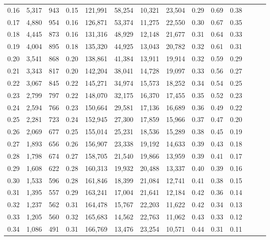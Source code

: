 \begin{tabular}{rrrrrrrrrrrrrr}
0.16 &   5,317 &  943 &  0.15 &  121,991 &   58,254 &  10,321 &  23,504 &  0.29 &  0.69 &      0.38 \\
0.17 &   4,880 &  954 &  0.16 &  126,871 &   53,374 &  11,275 &  22,550 &  0.30 &  0.67 &      0.35 \\
0.18 &   4,445 &  873 &  0.16 &  131,316 &   48,929 &  12,148 &  21,677 &  0.31 &  0.64 &      0.33 \\
0.19 &   4,004 &  895 &  0.18 &  135,320 &   44,925 &  13,043 &  20,782 &  0.32 &  0.61 &      0.31 \\
0.20 &   3,541 &  868 &  0.20 &  138,861 &   41,384 &  13,911 &  19,914 &  0.32 &  0.59 &      0.29 \\
0.21 &   3,343 &  817 &  0.20 &  142,204 &   38,041 &  14,728 &  19,097 &  0.33 &  0.56 &      0.27 \\
0.22 &   3,067 &  845 &  0.22 &  145,271 &   34,974 &  15,573 &  18,252 &  0.34 &  0.54 &      0.25 \\
0.23 &   2,799 &  797 &  0.22 &  148,070 &   32,175 &  16,370 &  17,455 &  0.35 &  0.52 &      0.23 \\
0.24 &   2,594 &  766 &  0.23 &  150,664 &   29,581 &  17,136 &  16,689 &  0.36 &  0.49 &      0.22 \\
0.25 &   2,281 &  723 &  0.24 &  152,945 &   27,300 &  17,859 &  15,966 &  0.37 &  0.47 &      0.20 \\
0.26 &   2,069 &  677 &  0.25 &  155,014 &   25,231 &  18,536 &  15,289 &  0.38 &  0.45 &      0.19 \\
0.27 &   1,893 &  656 &  0.26 &  156,907 &   23,338 &  19,192 &  14,633 &  0.39 &  0.43 &      0.18 \\
0.28 &   1,798 &  674 &  0.27 &  158,705 &   21,540 &  19,866 &  13,959 &  0.39 &  0.41 &      0.17 \\
0.29 &   1,608 &  622 &  0.28 &  160,313 &   19,932 &  20,488 &  13,337 &  0.40 &  0.39 &      0.16 \\
0.30 &   1,533 &  596 &  0.28 &  161,846 &   18,399 &  21,084 &  12,741 &  0.41 &  0.38 &      0.15 \\
0.31 &   1,395 &  557 &  0.29 &  163,241 &   17,004 &  21,641 &  12,184 &  0.42 &  0.36 &      0.14 \\
0.32 &   1,237 &  562 &  0.31 &  164,478 &   15,767 &  22,203 &  11,622 &  0.42 &  0.34 &      0.13 \\
0.33 &   1,205 &  560 &  0.32 &  165,683 &   14,562 &  22,763 &  11,062 &  0.43 &  0.33 &      0.12 \\
0.34 &   1,086 &  491 &  0.31 &  166,769 &   13,476 &  23,254 &  10,571 &  0.44 &  0.31 &      0.11 \\

\end{tabular}
